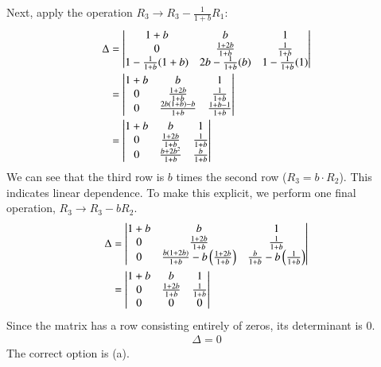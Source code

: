 \documentclass[journal]{IEEEtran}
\begin{document}
	Next, apply the operation $R_3 \to R_3 - \frac{1}{1+b}R_1$:
	\begin{align}
		\Delta &= \begin{vmatrix}1+b & b & 1 \\ 0 & \frac{1+2b}{1+b} & \frac{1}{1+b} \\ 1 - \frac{1}{1+b}(1+b) & 2b - \frac{1}{1+b}(b) & 1 - \frac{1}{1+b}(1)\end{vmatrix} \\
		&= \begin{vmatrix}1+b & b & 1 \\ 0 & \frac{1+2b}{1+b} & \frac{1}{1+b} \\ 0 & \frac{2b(1+b)-b}{1+b} & \frac{1+b-1}{1+b}\end{vmatrix} \\
		&= \begin{vmatrix}1+b & b & 1 \\ 0 & \frac{1+2b}{1+b} & \frac{1}{1+b} \\ 0 & \frac{b+2b^2}{1+b} & \frac{b}{1+b}\end{vmatrix}
	\end{align}
	We can see that the third row is $b$ times the second row ($R_3 = b \cdot R_2$). This indicates linear dependence. To make this explicit, we perform one final operation, $R_3 \to R_3 - bR_2$.
	\begin{align}
		\Delta &= \begin{vmatrix}1+b & b & 1 \\ 0 & \frac{1+2b}{1+b} & \frac{1}{1+b} \\ 0 & \frac{b(1+2b)}{1+b} - b\left(\frac{1+2b}{1+b}\right) & \frac{b}{1+b} - b\left(\frac{1}{1+b}\right)\end{vmatrix} \\
		&= \begin{vmatrix}1+b & b & 1 \\ 0 & \frac{1+2b}{1+b} & \frac{1}{1+b} \\ 0 & 0 & 0\end{vmatrix}
	\end{align}
	Since the matrix has a row consisting entirely of zeros, its determinant is 0.
	\begin{align}
		\Delta = 0
	\end{align}
	The correct option is (a).
	
\end{document}
